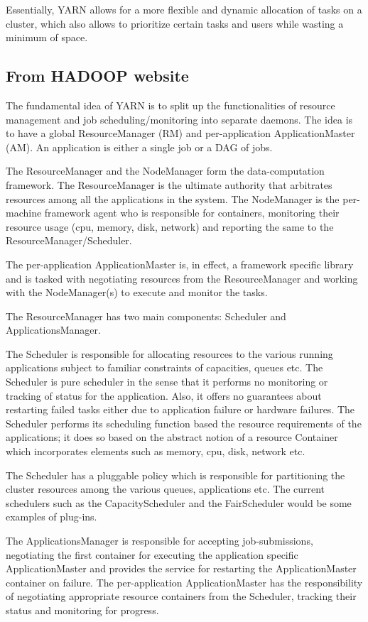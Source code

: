 \documentclass{article}
\begin{document}
Essentially, YARN allows for a more flexible and dynamic allocation of tasks on a cluster, which also allows to prioritize certain tasks and users while wasting a minimum of space.

\subsection{From HADOOP website}

The fundamental idea of YARN is to split up the functionalities of resource management and job scheduling/monitoring into separate daemons. The idea is to have a global ResourceManager (RM) and per-application ApplicationMaster (AM). An application is either a single job or a DAG of jobs.

The ResourceManager and the NodeManager form the data-computation framework. The ResourceManager is the ultimate authority that arbitrates resources among all the applications in the system. The NodeManager is the per-machine framework agent who is responsible for containers, monitoring their resource usage (cpu, memory, disk, network) and reporting the same to the ResourceManager/Scheduler.

The per-application ApplicationMaster is, in effect, a framework specific library and is tasked with negotiating resources from the ResourceManager and working with the NodeManager(s) to execute and monitor the tasks.

The ResourceManager has two main components: Scheduler and ApplicationsManager.

The Scheduler is responsible for allocating resources to the various running applications subject to familiar constraints of capacities, queues etc. The Scheduler is pure scheduler in the sense that it performs no monitoring or tracking of status for the application. Also, it offers no guarantees about restarting failed tasks either due to application failure or hardware failures. The Scheduler performs its scheduling function based the resource requirements of the applications; it does so based on the abstract notion of a resource Container which incorporates elements such as memory, cpu, disk, network etc.

The Scheduler has a pluggable policy which is responsible for partitioning the cluster resources among the various queues, applications etc. The current schedulers such as the CapacityScheduler and the FairScheduler would be some examples of plug-ins.

The ApplicationsManager is responsible for accepting job-submissions, negotiating the first container for executing the application specific ApplicationMaster and provides the service for restarting the ApplicationMaster container on failure. The per-application ApplicationMaster has the responsibility of negotiating appropriate resource containers from the Scheduler, tracking their status and monitoring for progress.
\end{document}
